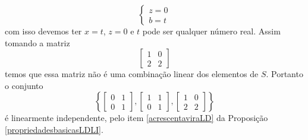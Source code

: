 \begin{exemplos}
\begin{solucao}
\begin{enumerate}
\[\begin{cases}
            z = 0\\
            b = t
          \end{cases}
        \]
        com isso devemos ter $x = t$, $z = 0$ e $t$ pode ser qualquer número real. Assim tomando a matriz
        \[
          \begin{bmatrix}
            1 & 0\\
            2 & 2
          \end{bmatrix}
        \]
        temos que essa matriz não é uma combinação linear dos elementos de $S$. Portanto o conjunto
        \[
          \left\{\begin{bmatrix}0 & 1\\0 & 1\end{bmatrix}, \begin{bmatrix}1 & 1\\0 & 1\end{bmatrix}, \begin{bmatrix}1 & 0\\2 & 2\end{bmatrix}\right\}
        \]
        é linearmente independente, pelo item \ref{acrescentaviraLD} da Proposição \ref{propriedadesbasicasLDLI}.


\end{enumerate}
\end{solucao}
\end{exemplos}
